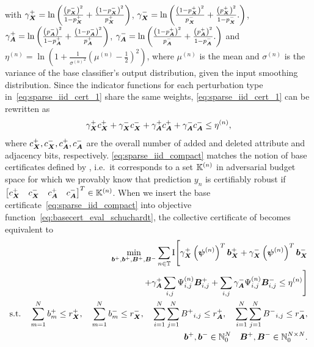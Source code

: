 with
${\gamma}_{\bm{X}}^+ = \ln\left( \frac{\left(p_{\bm{X}}^{-}\right)^2}{1 - p_{\bm{X}}^{+}}
     +
     \frac{\left(1 - p_{\bm{X}}^{-}\right)^2}{p_{\bm{X}}^{+}}
\right)$,
${\gamma}_{\bm{X}}^- = \ln\left( \frac{\left(1 - p_{\bm{X}}^{+}\right)^2}{p_{\bm{X}}^{-}}
+ \frac{\left(p_{\bm{X}}^{+}\right)^2}{1 - p_{\bm{X}}^{-}}.
\right)$,
${\gamma}_{\bm{A}}^+ = \ln\left( \frac{\left(p_{\bm{A}}^{-}\right)^2}{1 - p_{\bm{A}}^{+}}
     +
     \frac{\left(1 - p_{\bm{A}}^{-}\right)^2}{p_{\bm{A}}^{+}}
\right)$,
${\gamma}_{\bm{A}}^- = \ln\left( \frac{\left(1 - p_{\bm{A}}^{+}\right)^2}{p_{\bm{A}}^{-}}
+ \frac{\left(p_{\bm{A}}^{+}\right)^2}{1 - p_{\bm{A}}^{-}}.
\right)$
and
$\eta^{(n)} = \ln\left(1 + \frac{1}{{\sigma^{(n)}}^2}\left(\mu^{(n)} - \frac{1}{2}\right)^2\right)$,
where $\mu^{(n)}$ is the mean and $\sigma^{(n)}$ is the variance of the base classifier's output distribution, given the input smoothing distribution.
Since the indicator functions for each perturbation type in~\autoref{eq:sparse_iid_cert_1}  share the same weights,  \autoref{eq:sparse_iid_cert_1} can be rewritten as
\begin{equation}\label{eq:sparse_iid_compact}
    \gamma_{\bm{X}}^{+} c_{\bm{X}}^{+}  +  \gamma_{\bm{X}}^{-} c_{\bm{X}}^{-}
    +  \gamma_{\bm{A}}^{+} c_{\bm{A}}^{+} + \gamma_{\bm{A}}^{-} c_{\bm{A}}^{-}  \leq \eta^{(n)},
\end{equation}
where $c_{\bm{X}}^{+},c_{\bm{X}}^{-},c_{\bm{A}}^{+},c_{\bm{A}}^{-}$ are the overall number of added and deleted attribute and adjacency bits, respectively.
\autoref{eq:sparse_iid_compact} matches the notion of  base certificates defined by \citet{Schuchardt2021},
i.e.~it corresponds to a set ${\mathbb{K}}^{(n)}$ in adversarial budget space for which we provably know that
prediction $y_n$ is certifiably robust if $\begin{bmatrix} c_{\bm{X}}^{+} &  c_{\bm{X}}^{-} & c_{\bm{A}}^{+} &  c_{\bm{A}}^{-}\end{bmatrix}^T \in {\mathbb{K}}^{(n)}$.
When we insert the base certificate~\autoref{eq:sparse_iid_compact} into objective function~\autoref{eq:basecert_eval_schuchardt}, the collective certificate of \citet{Schuchardt2021} becomes equivalent to
\begin{align}\label{eq:schuchardt_final_1}
    \min_{{\bm{b}}^{+},{\bm{b}}^{+},{\bm{B}}^{+},{\bm{B}}^{-}}
    \sum_{n \in {\mathbb{T}}} \mathrm{I}
    \Biggl[
    \gamma_{\bm{X}}^{+} \left({\bm{\psi}}^{(n)}\right)^T {\bm{b}}_{\bm{X}}^{+}  + \gamma_{\bm{X}}^{-} \left({\bm{\psi}}^{(n)}\right)^T {\bm{b}}_{\bm{X}}^{-} 
    \notag\\
    + \gamma_{\bm{A}}^{+} \sum_{i,j}{\Psi}^{(n)}_{i,j} {\bm{B}}_{i,j}^{+}  + \sum_{i,j} \gamma_{\bm{A}}^{-} {\Psi}^{(n)}_{i,j} {\bm{B}}_{i,j}^{-} \leq \eta^{(n)}
    \Biggr]
    \\
    \label{eq:schuchardt_final_2}
    \text{s.t.} \quad
    \sum_{m=1}^N {b}^{+}_m \leq r_{\bm{X}}^{+},
    \quad
    \sum_{m=1}^N {b}^{-}_m \leq r_{\bm{X}}^{-},
    \quad
    \sum_{i=1}^N \sum_{j=1}^N {{B}^{+}}_{i,j} \leq r_{\bm{A}}^{+},
    \quad
    \sum_{i=1}^N \sum_{j=1}^N {{B}^{-}}_{i,j} \leq r_{\bm{A}}^{-},
    \\
    \label{eq:schuchardt_final_3}
    {\bm{b}}^{+}, {\bm{b}}^{-} \in {\mathbb{N}}_0^{N} \quad {\bm{B}}^{+}, {\bm{B}}^{-} \in {\mathbb{N}}_0^{N \times N}.
\end{align}


